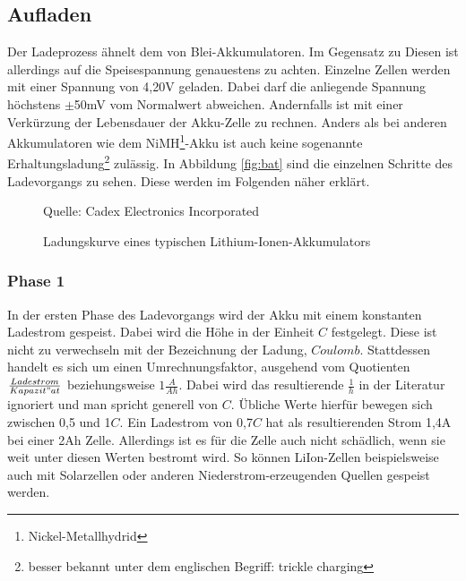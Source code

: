 \documentclass[12pt]{scrreprt} %
\begin{document}
\subsection{Aufladen}
Der Ladeprozess ähnelt dem von Blei-Akkumulatoren. Im Gegensatz zu Diesen ist allerdings auf die Speisespannung genauestens zu achten. Einzelne Zellen werden mit einer Spannung von 4,20V geladen. Dabei darf die anliegende Spannung höchstens $\pm$50mV vom Normalwert abweichen. Andernfalls ist mit einer Verkürzung der Lebensdauer der Akku-Zelle zu rechnen. Anders als bei anderen Akkumulatoren wie dem NiMH\footnote{Nickel-Metallhydrid}-Akku ist auch keine sogenannte Erhaltungsladung\footnote{besser bekannt unter dem englischen Begriff: trickle charging} zulässig. In Abbildung \vref{fig:bat} sind die einzelnen Schritte des Ladevorgangs zu sehen. Diese werden im Folgenden näher erklärt.
\begin {figure}[htbp]
\caption{Ladungskurve eines typischen Lithium-Ionen-Akkumulators}
      \begin{center}
      \end{center}
Quelle: Cadex Electronics Incorporated \citep{BAT}
\label{fig:bat}
\end{figure}
\subsubsection{Phase 1}
In der ersten Phase des Ladevorgangs wird der Akku mit einem konstanten Ladestrom gespeist. Dabei wird die Höhe in der Einheit $C$ festgelegt. Diese ist nicht zu verwechseln mit der Bezeichnung der Ladung, $Coulomb$. Stattdessen handelt es sich um einen Umrechnungsfaktor, ausgehend vom Quotienten $\frac{Ladestrom}{Kapazit"at}$ beziehungsweise $1\frac{A}{Ah}$. Dabei wird das resultierende $\frac{1}{h}$ in der Literatur ignoriert und man spricht generell von $C$. Übliche Werte hierfür bewegen sich zwischen 0,5 und 1$C$. Ein Ladestrom von 0,7$C$ hat als resultierenden Strom 1,4A bei einer 2Ah Zelle. Allerdings ist es für die Zelle auch nicht schädlich, wenn sie weit unter diesen Werten bestromt wird. So können LiIon-Zellen beispielsweise auch mit Solarzellen oder anderen Niederstrom-erzeugenden Quellen gespeist werden.
\end{document}
